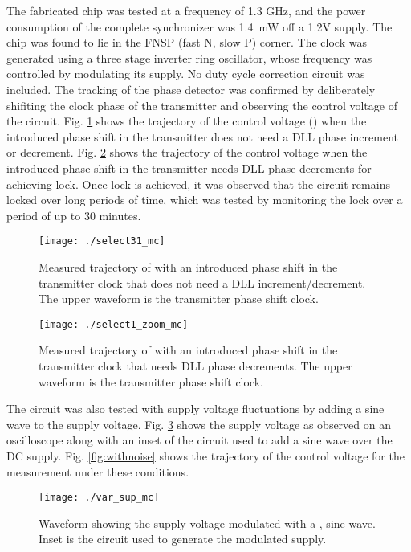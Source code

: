 \documentclass[journal,twoside,letterpaper]{IEEEtran}
\begin{document}
The fabricated chip was tested at a frequency of 1.3 GHz, and
the power consumption of the complete synchronizer was \mbox{1.4 mW}
off a 1.2V supply. 
The chip was found to lie in the FNSP (fast N, slow P) corner.
The clock was generated using a three stage inverter ring oscillator,
whose frequency was controlled by modulating its supply.
No duty cycle correction circuit was included.
The tracking of the phase detector
was confirmed by deliberately shifiting the clock
phase of the transmitter and observing the control voltage 
of the circuit.
Fig. \ref{fig:nojump}
shows the trajectory of the control voltage ()
when the introduced phase shift in the transmitter does not need
a DLL phase increment or decrement. Fig. \ref{fig:withjump} shows the 
trajectory of the control voltage when the introduced phase shift in the
transmitter needs DLL phase decrements for achieving lock. Once 
lock is achieved, it was observed that the circuit remains locked
over long periods of time, 
which was tested by monitoring the lock over 
a period of up to 30 minutes.

\begin{figure}[h!]
\centering
\texttt{[image: ./select31\_mc]}
\caption{Measured trajectory of  with an introduced
 phase shift in the transmitter clock that 
does not need a DLL increment/decrement. The upper waveform is the
transmitter phase shift clock.}
\label{fig:nojump}
\end{figure}

\begin{figure}[h!]
\centering
\texttt{[image: ./select1\_zoom\_mc]}
\caption{Measured trajectory of  with an introduced
phase shift in the transmitter clock that 
needs DLL phase decrements. The upper waveform is the transmitter
phase shift clock.}
\label{fig:withjump}
\end{figure}

The circuit was also tested with supply voltage fluctuations 
by adding a   sine wave to the supply voltage.
Fig. \ref{fig:supply_nw} shows the supply voltage as observed on an
oscilloscope along with an inset of the circuit used to add a 
sine wave over the DC supply. 
Fig. \ref{fig:withnoise} shows the trajectory of the control voltage for 
the measurement under these conditions.

\begin{figure}[h!]
\centering
\texttt{[image: ./var\_sup\_mc]}
\caption{Waveform showing the supply voltage modulated with a , 
 sine wave. Inset is the circuit used to generate the 
modulated supply.}
\label{fig:supply_nw}
\end{figure}
\end{document}
